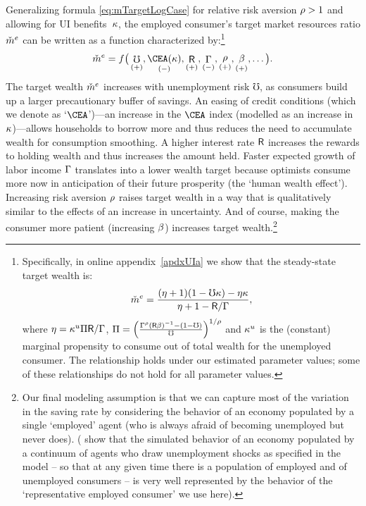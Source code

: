 \documentclass[titlepage]{\econtex}
\begin{document}
Generalizing  formula \eqref{eq:mTargetLogCase} for relative risk aversion $\rho > 1$ and allowing for UI benefits~$\kappa$, the employed consumer's target market resources ratio $\check{m}^{e}$ can be written as a function characterized by:\footnote{%
  Specifically, in online appendix~\ref{apdxUIa} we show that the steady-state target wealth is:
$$
\check{m}^{e}=\frac{(\eta+1)(1-\mho\kappa)-\eta\kappa}{\eta+1-\mathsf{R}/\Gamma},
$$
where $\eta=\kappa^u\Pi\mathsf{R}/\Gamma$, $\Pi=\Big(\frac{\Gamma^{\rho}(\mathsf{R}\beta)^{-1}-(1-\mho)}{\mho}\Big)^{1/\rho}$ and $\kappa^u$ is the (constant) marginal propensity to consume out of total wealth for the unemployed consumer. The relationship holds under our estimated parameter values; some of these relationships do not hold for all parameter values.
}
\begin{equation}
\mTarg^{e}=f\big(\mathop{\mho}_{(+)},\mathop{\CEA(\Severance)}_{(-)},\mathop{\Rfree}_{(+)},\mathop{\PGro}_{(-)},\mathop{\CRRA}_{(+)},\mathop{\DiscFac}_{(+)},\dots\big). \label{mTargetNonlin}
\end{equation}
The target wealth $\check{m}^{e}$ increases with unemployment risk $\mho$, as consumers build up a larger precautionary buffer of savings. %
An easing of credit conditions (which we denote as `$\CEA$')---an increase in the $\CEA$ index (modelled as an increase in $\kappa$)---allows households to borrow more and thus reduces the need to accumulate wealth for consumption smoothing. A higher interest rate $\mathsf{R}$ increases the rewards to holding wealth and thus increases the amount held. Faster expected growth of labor income $\Gamma$ translates into a lower wealth target because optimists consume more now in anticipation of their future prosperity (the `human wealth effect'). Increasing risk aversion $\rho$ raises target wealth in a way that is qualitatively similar to the effects of an increase in uncertainty.  And of course, making the consumer more patient (increasing $\beta$) increases target wealth.\footnote{Our final modeling assumption is that we can capture most of the variation in the saving rate by considering the behavior of an economy populated by a single `employed' agent (who is always afraid of becoming unemployed but never does).  (\cite{cjSOE} show that the simulated behavior of an economy populated by a continuum of agents who draw unemployment shocks as specified in the model -- so that at any given time there is a population of employed and of unemployed consumers -- is very well represented by the behavior of the `representative employed consumer' we use here).
}
\end{document}
